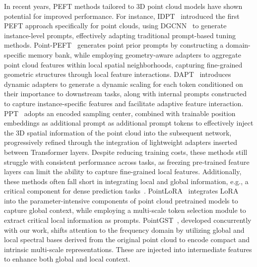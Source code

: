 In recent years, PEFT methods tailored to 3D point cloud models have shown potential for improved performance. 
For instance, IDPT~\cite{zha2023instance} introduced the first PEFT approach specifically for point clouds, using DGCNN~\cite{wang2019dynamic} to generate instance-level prompts, effectively adapting traditional prompt-based tuning methods.
Point-PEFT~\cite{tang2024point} generates point prior prompts by constructing a domain-specific memory bank, while employing geometry-aware adapters to aggregate point cloud features within local spatial neighborhoods, capturing fine-grained geometric structures through local feature interactions. DAPT~\cite{zhou2024dynamic} introduces dynamic adapters to generate a dynamic scaling for each token conditioned on their importance to downstream tasks, along with internal prompts constructed to capture instance-specific features and facilitate adaptive feature interaction. PPT~\cite{zhang2024positional} adopts an encoded sampling center, combined with trainable position embeddings as additional prompt as additional prompt tokens to effectively inject the 3D spatial information of the point cloud into the  subsequent  network, progressively refined through the integration of lightweight adapters inserted between Transformer layers. Despite reducing training costs, these methods still struggle with consistent performance across tasks, as freezing pre-trained feature layers can limit the ability to capture fine-grained local features. Additionally, these methods often fall short in integrating local and global information, e.g., a critical component for dense prediction tasks~\cite{chen2022vitadapter}. PointLoRA~\cite{wang2025pointlora} integrates LoRA~\cite{hu2021lora} into the parameter-intensive components of point cloud pretrained models to capture global context, while employing a multi-scale token selection module to extract critical local information as prompts. PointGST~\cite{liang2024parameter}, developed concurrently with our work, shifts attention to the frequency domain by utilizing global and local spectral bases derived from the original point cloud to encode compact and intrinsic multi-scale representations. These are injected into intermediate features to enhance both global and local context. 

